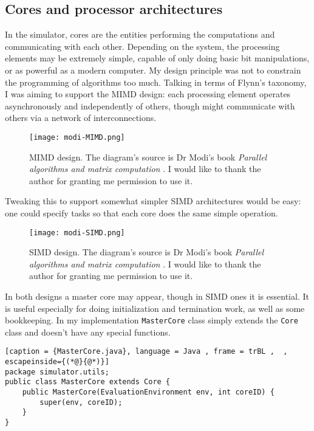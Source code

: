 \documentclass[12pt,a4paper,twoside,openright]{report}
\begin{document}
\subsection{Cores and processor architectures}
In the simulator, cores are the entities performing the computations and communicating with each other. Depending on the system, the processing elements may be extremely simple, capable of only doing basic bit manipulations, or as powerful as a modern computer. My design principle was not to constrain the programming of algorithms too much. Talking in terms of Flynn's taxonomy\cite{Flynn}, I was aiming to support the MIMD design: each processing element operates asynchronously and independently of others, though might communicate with others via a network of interconnections. 

\begin{figure}
  \caption{MIMD design. The diagram's source is Dr Modi's book \textit{Parallel algorithms and matrix computation} \cite{modibook}. I would like to thank the author for granting me permission to use it.}
  \texttt{[image: modi-MIMD.png]}
\end{figure}

Tweaking this to support somewhat simpler SIMD architectures would be easy: one could specify tasks so that each core does the same simple operation. 

\begin{figure}[h]
  \caption{SIMD design. The diagram's source is Dr Modi's book \textit{Parallel algorithms and matrix computation} \cite{modibook}. I would like to thank the author for granting me permission to use it.}
  \texttt{[image: modi-SIMD.png]}
\end{figure}

In both designs a master core may appear, though in SIMD ones it is essential. It is useful especially for doing initialization and termination work, as well as some bookkeeping. In my implementation \texttt{MasterCore} class simply extends the \texttt{Core} class and doesn't have any special functions.

\begin{lstlisting}[caption = {MasterCore.java}, language = Java , frame = trBL ,  , escapeinside={(*@}{@*)}]
package simulator.utils;
public class MasterCore extends Core {
    public MasterCore(EvaluationEnvironment env, int coreID) {
        super(env, coreID);
    }
}
\end{lstlisting}
\end{document}
